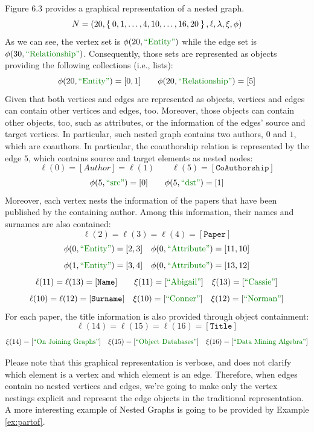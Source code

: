 \begin{example}
Figure 6.3 provides a graphical representation of a nested graph.
\[N=(20,\Set{0,1,\dots,4,10,\dots,16,20},\ell,\lambda,\xi,\phi)\]
As we can see, the vertex set is $\phi(20,\ONTA)$ while the edge set is $\phi(30,\RELA)$. Consequently, those sets are represented as objects providing the following collections (i.e., lists):
\[\phi(20,\ONTA)=[0,1]\qquad \phi(20,\RELA)=[5]\]
Given that both vertices and edges are represented as objects, vertices and edges can contain other vertices and edges, too. Moreover, those objects can contain other objects, too, such as attributes, or the information of the edges' source and target vertices. In particular, such nested graph contains two authors, $0$ and $1$, which are coauthors. 
In particular, the coauthorship relation is represented by the edge $5$, which contains source and target elements as nested nodes:
\[\ell(0)=[Author]=\ell(1)\qquad \ell(5)=[\texttt{CoAuthorship}]\]
\[\phi(5,\SRC)=[0]\qquad \phi(5,\DST)=[1]\]
Moreover, each vertex nests the information of the papers that have been published by the containing author. Among this information, their names and surnames are also contained:
\[ \ell(2)=\ell(3)=\ell(4)=[\texttt{Paper}]\]
\[\phi(0,\ONTA)=[2,3]\quad \phi(0,\ATTR)=[11,10]\]
\[\phi(1,\ONTA)=[3,4]\quad \phi(0,\ATTR)=[13,12]\]
\[\ell(11)=\ell(13)=[\texttt{Name}]\qquad \xi(11)=[\mstr{Abigail}]\quad \xi(13)=[\mstr{Cassie}]\]
\[\ell(10)=\ell(12)=[\texttt{Surname}]\quad \xi(10)=[\mstr{Conner}]\quad \xi(12)=[\mstr{Norman}]\]
For each paper, the title information is also provided through object containment:
\[\ell(14)=\ell(15)=\ell(16)=[\texttt{Title}]\]
\[\xi(14)=[\mstr{On Joining Graphs}]\quad \xi(15)=[\mstr{Object Databases}]\quad \xi(16)=[\mstr{Data Mining Algebra}]\]
\end{example}

Please note that this graphical representation is verbose, and does not clarify which element is a vertex and which element is an edge. Therefore, when edges contain no nested vertices and edges, we're going to make only the vertex nestings explicit and represent the edge objects in the traditional representation. A more interesting example of Nested Graphs is going to be provided by Example \vref{ex:partof}.



